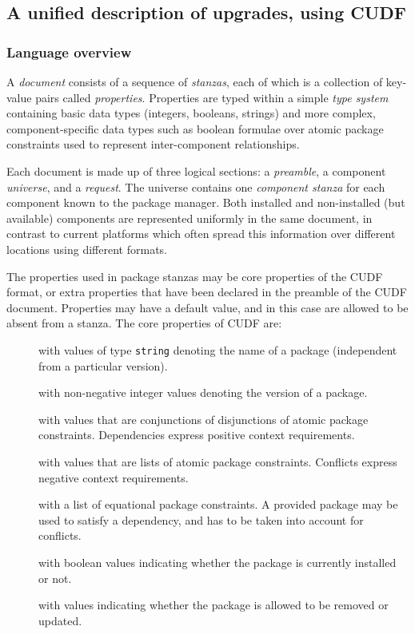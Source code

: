 \subsection{A unified description of upgrades, using CUDF}
\label{sec:cudf}

\subsubsection{Language overview}

A \emph{\CUDF{} document} consists of a sequence of \emph{stanzas},
each of which is a collection of key-value pairs called
\emph{properties}. Properties are typed within a simple \emph{type
system} containing basic data types (integers, booleans, strings) and
more complex, component-specific data types such as boolean formulae
over atomic package constraints used to represent inter-component
relationships.

Each \CUDF{} document is made up of three logical sections: a
\emph{preamble}, a component \emph{universe}, and a \emph{request}.
The universe contains one \emph{component stanza} for each component
known to the package manager.  Both installed and non-installed (but
available) components are represented uniformly in the same document,
in contrast to current platforms which often spread this information
over different locations using different formats.

The properties used in package stanzas may be core properties of the
CUDF format, or extra properties that have been declared in the
preamble of the CUDF document. Properties may have a default value,
and in this case are allowed to be absent from a stanza. The core
properties of CUDF are:
\begin{description}
\item[] with values of type \texttt{string} denoting the name of
  a package (independent from a particular version).
\item[] with non-negative integer values denoting the version
  of a package.
\item[] with values that are conjunctions of
  disjunctions of atomic package constraints. Dependencies express positive
  context requirements.
\item[] with values that are lists of atomic package
  constraints. Conflicts express negative context requirements.
\item[] with a list of equational package
  constraints. A provided package may be used to satisfy a dependency,
  and has to be taken into account for conflicts.
\item[] with boolean values indicating whether the package
  is currently installed or not.
\item[] with values indicating whether the package is allowed to
  be removed or updated.
\end{description}

